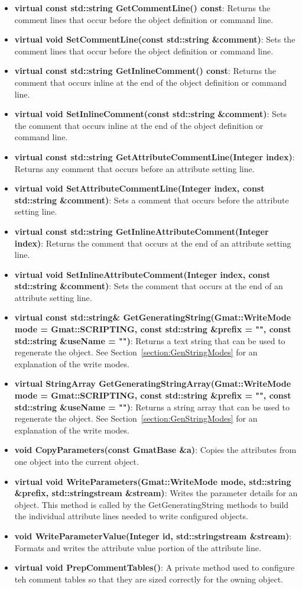 \begin{itemize}
\item \textbf{virtual const std::string GetCommentLine() const}: Returns the comment lines that
occur before the object definition or command line.
\item \textbf{virtual void SetCommentLine(const std::string \&comment)}: Sets the comment lines that
occur before the object definition or command line.
\item \textbf{virtual const std::string GetInlineComment() const}: Returns the comment that occurs
inline at the end of the object definition or command line.
\item \textbf{virtual void SetInlineComment(const std::string \&comment)}: Sets the comment that
occurs inline at the end of the object definition or command line.
\item \textbf{virtual const std::string GetAttributeCommentLine(Integer index)}: Returns any comment
that occurs before an attribute setting line.
\item \textbf{virtual void SetAttributeCommentLine(Integer index, const std::string \&comment)}:
Sets a comment that occurs before the attribute setting line.
\item \textbf{virtual const std::string GetInlineAttributeComment(Integer index)}: Returns the
comment that occurs at the end of an attribute setting line.
\item \textbf{virtual void  SetInlineAttributeComment(Integer index, const std::string \&comment)}:
Sets the comment that occurs at the end of an attribute setting line.
\item \textbf{virtual const std::string\& GetGeneratingString(Gmat::WriteMode mode =
Gmat::SCRIPTING, const std::string \&prefix = "", const std::string \&useName = "")}: Returns a
text string that can be used to regenerate the object.  See Section~\ref{section:GenStringModes} for
an explanation of the write modes.
\item \textbf{virtual StringArray GetGeneratingStringArray(Gmat::WriteMode mode = Gmat::SCRIPTING,
const std::string \&prefix = "", const std::string \&useName = "")}: Returns a string array that can
be used to regenerate the object.  See Section~\ref{section:GenStringModes} for an explanation of
the write modes.
\item \textbf{void CopyParameters(const GmatBase \&a)}: Copies the attributes from one object into
the current object.
\item \textbf{virtual void WriteParameters(Gmat::WriteMode mode, std::string \&prefix,
std::stringstream \&stream)}: Writes the parameter details for an object.  This method is called by
the GetGeneratingString methods to build the individual attribute lines needed to write configured
objects.
\item \textbf{void WriteParameterValue(Integer id, std::stringstream \&stream)}: Formats and
writes the attribute value portion of the attribute line.
\item \textbf{virtual void PrepCommentTables()}: A private method used to configure teh comment
tables so that they are sized correctly for the owning object.
\end{itemize}

